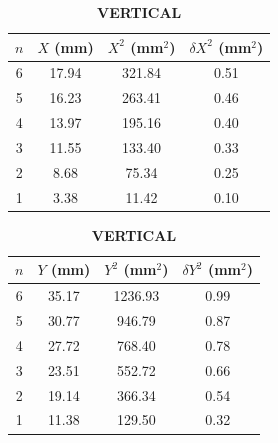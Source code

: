 \documentclass[a4paper,11pt]{article}
\begin{document}
\begin{table}[H]
  \centering
  \caption{6 kg — HORIZONTAL (left) and VERTICAL (right)}\label{tab:6kg-hv}
  \begin{subtable}[t]{0.47\linewidth}
    \centering
    \caption*{\textbf{HORIZONTAL}}\label{tab:6kg-h}
    \begin{tabular}{cccc}
      \toprule
      $n$ & $X$ (mm) & $X^2$ (mm$^2$) & $\delta X^2$ (mm$^2$)\\
      \midrule
       6 & 17.94 & 321.84 & 0.51\\
       5 & 16.23 & 263.41 & 0.46\\
       4 & 13.97 & 195.16 & 0.40\\
       3 & 11.55 & 133.40 & 0.33\\
       2 &  8.68 &  75.34 & 0.25\\
       1 &  3.38 &  11.42 & 0.10\\
      \bottomrule
    \end{tabular}
  \end{subtable}
  \hfill
  \begin{subtable}[t]{0.47\linewidth}
    \centering
    \caption*{\textbf{VERTICAL}}\label{tab:6kg-v}
    \begin{tabular}{cccc}
      \toprule
      $n$ & $Y$ (mm) & $Y^2$ (mm$^2$) & $\delta Y^2$ (mm$^2$)\\
      \midrule
       6 & 35.17 & 1236.93 & 0.99\\
       5 & 30.77 &  946.79 & 0.87\\
       4 & 27.72 &  768.40 & 0.78\\
       3 & 23.51 &  552.72 & 0.66\\
       2 & 19.14 &  366.34 & 0.54\\
       1 & 11.38 &  129.50 & 0.32\\
      \bottomrule
    \end{tabular}
  \end{subtable}
\end{table}
\end{document}
